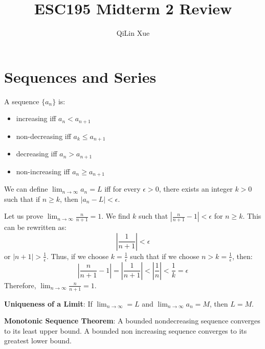 \documentclass{article}
\title{ESC195 Midterm 2 Review}
\author{QiLin Xue}
\begin{document}
    \maketitle
    \tableofcontents
    \section{Sequences and Series}
    A sequence $\{a_n\}$ is:
        \begin{itemize}
            \item increasing iff $a_n < a_{n+1}$
            \item non-decreasing iff $a_k \le a_{n+1}$
            \item decreasing iff $a_n > a_{n+1}$
            \item non-increasing iff $a_n \ge a_{n+1}$
        \end{itemize}
        \begin{definition}
            We can define $\lim_{n\to\infty} a_n = L$ iff for every $\epsilon>0$, there exists an integer $k>0$ such that if $n \ge k$, then $|a_n - L| < \epsilon$.
        \end{definition}
        \begin{example}
            Let us prove $\lim_{n\to\infty} \frac{n}{n+1}=1$. We  find $k$ such that $\left|\frac{n}{n+1}-1\right|<\epsilon$ for $n\ge k$. This can be rewritten as:
            \begin{equation}
                \left|\frac{1}{n+1}\right| < \epsilon 
            \end{equation}
            or $|n+1| > \frac{1}{\epsilon}$. Thus, if we choose $k = \frac{1}{\epsilon}$ such that if we choose $n>k=\frac{1}{\epsilon}$, then:
            \begin{equation}
                \left|\frac{n}{n+1}-1\right| = \left|\frac{1}{n+1}\right| < \left|\frac{1}{n}\right| < \frac{1}{k} = \epsilon
            \end{equation}
            Therefore, $\lim_{n\to\infty} \frac{n}{n+1}=1$.
        \end{example}
        \begin{theorem}
            \textbf{Uniqueness of a Limit}: If $\lim_{n\to\infty} = L$ and $\lim_{n\to\infty}a_n = M$, then $L=M$.
        \end{theorem}
        \begin{theorem}
            \textbf{Monotonic Sequence Theorem}: A bounded nondecreasing sequence converges to its least upper bound. A bounded non increasing sequence converges to its greatest lower bound.
        \end{theorem}
\end{document}
